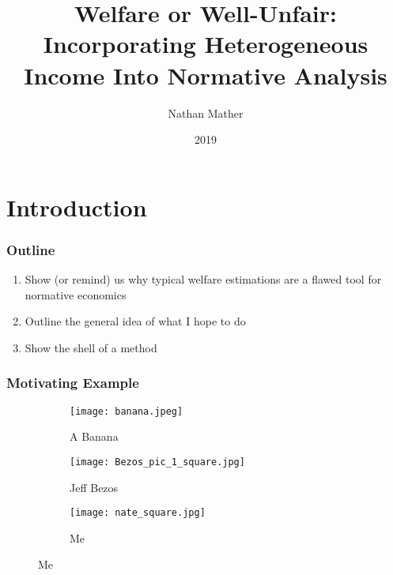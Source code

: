 \documentclass{beamer}
\title{Welfare or Well-Unfair: Incorporating Heterogeneous Income Into Normative Analysis}
\author{Nathan Mather}
\institute{University of Michigan}
\date{2019}
\begin{document}
	
	\frame{\titlepage}
	
\section{Introduction}

\begin{frame}
	\frametitle{Outline}
	\begin{enumerate}
		\setlength{\itemsep}{8mm}
		 \large
		 \item Show (or remind) us why typical welfare estimations are a flawed tool for normative economics 
		\item Outline the general idea of what I hope to do 
		\item Show the shell of a method 
	\end{enumerate}
\end{frame}



\begin{frame}
\frametitle{Motivating Example}

\begin{figure}
	\centering
\begin{subfigure}[b]{.3\linewidth}
	\texttt{[image: banana.jpeg]}
	\caption{A Banana}\label{fig:banana}
\end{subfigure}


\begin{subfigure}[b]{.3\linewidth}
	\texttt{[image: Bezos\_pic\_1\_square.jpg]}
	\caption{Jeff Bezos}\label{fig:Bezos}
\end{subfigure}
\begin{subfigure}[b]{.3\linewidth}
	\texttt{[image: nate\_square.jpg]}
	\caption{Me}\label{fig:Nate}
\end{subfigure}
\end{figure}

\end{frame}
\end{document}
